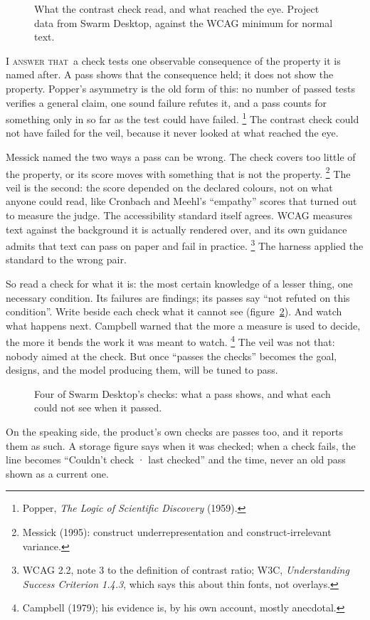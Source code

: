 \documentclass[11pt,a4paper]{article}
\newcounter{art}
\newcommand{\Respondeo}{\par\vspace{1.5mm}\noindent\textsc{I answer that}\ }
\newcommand{\Fig}[3]{%
  \begin{figure}[tbp]\centering #1 \caption{#2}\label{#3}\end{figure}}
\begin{document}
\Fig{\ChartVeil}{What the contrast check read, and what reached the eye. Project data from Swarm Desktop, against the WCAG minimum for normal text.}{fig:veil}

\Respondeo a check tests one observable consequence of the property it is named after. A pass shows that the consequence held; it does not show the property. Popper's asymmetry is the old form of this: no number of passed tests verifies a general claim, one sound failure refutes it, and a pass counts for something only in so far as the test could have failed.%
\footnote{Popper, \textit{The Logic of Scientific Discovery} (1959).}
The contrast check could not have failed for the veil, because it never looked at what reached the eye.

Messick named the two ways a pass can be wrong. The check covers too little of the property, or its score moves with something that is not the property.%
\footnote{Messick (1995): construct underrepresentation and construct-irrelevant variance.}
The veil is the second: the score depended on the declared colours, not on what anyone could read, like Cronbach and Meehl's ``empathy'' scores that turned out to measure the judge. The accessibility standard itself agrees. WCAG measures text against the background it is actually rendered over, and its own guidance admits that text can pass on paper and fail in practice.%
\footnote{WCAG 2.2, note 3 to the definition of contrast ratio; W3C, \textit{Understanding Success Criterion 1.4.3}, which says this about thin fonts, not overlays.}
The harness applied the standard to the wrong pair.

So read a check for what it is: the most certain knowledge of a lesser thing, one necessary condition. Its failures are findings; its passes say ``not refuted on this condition''. Write beside each check what it cannot see (figure~\ref{fig:cannotsee}). And watch what happens next. Campbell warned that the more a measure is used to decide, the more it bends the work it was meant to watch.%
\footnote{Campbell (1979); his evidence is, by his own account, mostly anecdotal.}
The veil was not that: nobody aimed at the check. But once ``passes the checks'' becomes the goal, designs, and the model producing them, will be tuned to pass.

\Fig{\FigCannotSee}{Four of Swarm Desktop's checks: what a pass shows, and what each could not see when it passed.}{fig:cannotsee}

On the speaking side, the product's own checks are passes too, and it reports them as such. A storage figure says when it was checked; when a check fails, the line becomes ``Couldn't check · last checked'' and the time, never an old pass shown as a current one.
\end{document}
